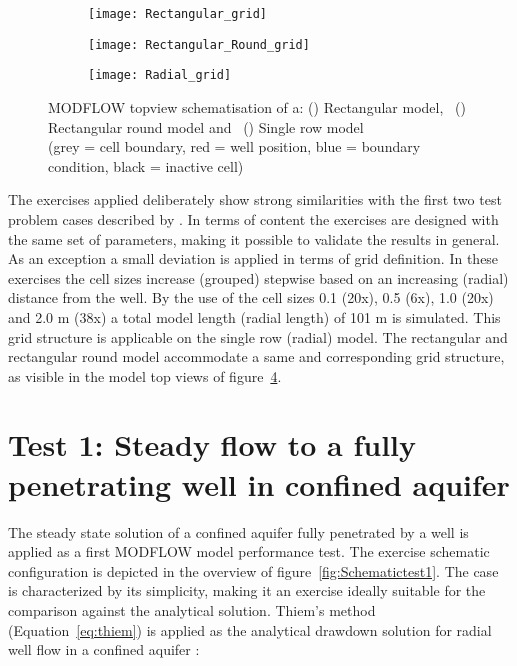 \begin{figure}[H]
	\centering
	\begin{subfigure}[b]{0.5\linewidth}
		\centering\texttt{[image: Rectangular\_grid]}
		\captionsetup{justification=centering}		
		\caption{\label{fig:Rectangular model}}
		\end{subfigure}%
	\begin{subfigure}[b]{0.5\linewidth}
        \centering\texttt{[image: Rectangular\_Round\_grid]}
		\captionsetup{justification=centering}		
		\caption{\label{fig:Rectangular round model}}
		\end{subfigure}
	\begin{subfigure}[b]{\linewidth}
        \centering\texttt{[image: Radial\_grid]}
		\captionsetup{justification=centering}		
		\caption{\label{fig:Single row model}}
		\end{subfigure}
	\captionsetup{justification=centering}	
	\caption[Modflow topview schematisation of a: () Rectangular model, ~() Rectangular round model and ~() Single row model]{MODFLOW topview schematisation of a: () Rectangular model, ~() Rectangular round model and ~() Single row model \\ (grey = cell boundary, red = well position, blue = boundary condition, black = inactive cell)} 
	\label{fig:Modflowtopview}
\end{figure} 
The exercises applied deliberately show strong similarities with the first two test problem cases described by \citet{Langevin2008}. In terms of content the exercises are designed with the same set of parameters, making it possible to validate the results in general. As an exception a small deviation is applied in terms of grid definition. In these exercises the cell sizes increase (grouped) stepwise based on an increasing (radial) distance from the well. By the use of the cell sizes 0.1 (20x), 0.5 (6x), 1.0 (20x) and 2.0 m (38x) a total model length (radial length) of 101 m is simulated. This grid structure is applicable on the single row (radial) model. The rectangular and rectangular round model accommodate a same and corresponding grid structure, as visible in the model top views of figure~\ref{fig:Modflowtopview}.   

\clearpage\section{Test 1: Steady flow to a fully penetrating well in confined aquifer}
\label{sec:test1}
The steady state solution of a confined aquifer fully penetrated by a well is applied as a first MODFLOW model performance test. The exercise schematic configuration is depicted in the overview of figure~\ref{fig:Schematictest1}. The case is characterized by its simplicity, making it an exercise ideally suitable for the comparison against the analytical solution. Thiem's method (Equation~\ref{eq:thiem}) is applied as the analytical drawdown solution for radial well flow in a confined aquifer \citep{Kruseman2000}:

